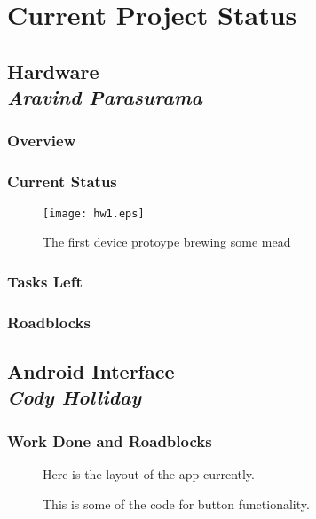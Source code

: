 \documentclass[draftclsnofoot,onecolumn,letterpaper,10pt]{IEEEtran}
\begin{document}
\section{Current Project Status}

\subsection{Hardware\\{\em\textbf{Aravind Parasurama}}}
\subsubsection{Overview}


\subsubsection{Current Status}
\begin{figure}
\label{fig:hw1}
\caption{The first device protoype brewing some mead}
\texttt{[image: hw1.eps]}
\end{figure}

\subsubsection{Tasks Left}

\subsubsection{Roadblocks}

\subsection{Android Interface\\{\em\textbf{Cody Holliday}}}


\subsubsection{Work Done and Roadblocks}

\newpage
\vfill

\begin{figure}
\label{fig:layout}
\caption{Here is the layout of the app currently.}
\end{figure}


\begin{figure}
\label{fig:code}
\caption{This is some of the code for button functionality.}
\end{figure}
\end{document}
